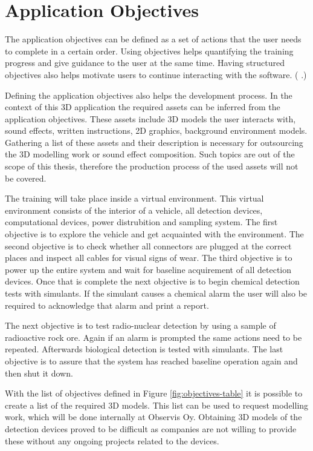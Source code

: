 \documentclass[12pt, a4paper,oneside, nocenter]{thesis}
\renewcommand{\citep}[1]{(\citeauthor{#1} \citeyear{#1}.)}
\begin{document}
\section{Application Objectives}
The application objectives can be defined as a set of actions that the user needs to complete in a certain order. Using objectives helps quantifying the training progress and give guidance to the user at the same time. Having structured objectives also helps motivate users to continue interacting with the software. \citep{goal-oriented-games}
\par
Defining the application objectives also helps the development process. In the context of this 3D application the required assets can be inferred from the application objectives. These assets include 3D models the user interacts with, sound effects, written instructions, 2D graphics, background environment models. Gathering a list of these assets and their description is necessary for outsourcing the 3D modelling work or sound effect composition. Such topics are out of the scope of this thesis, therefore the production process of the used assets will not be covered.
\par
The training will take place inside a virtual environment. This virtual environment consists of the interior of a vehicle, all detection devices, computational devices, power distrubition and sampling system. The first objective is to explore the vehicle and get acquainted with the environment. The second objective is to check whether all connectors are plugged at the correct places and inspect all cables for visual signs of wear. The third objective is to power up the entire system and wait for baseline acquirement of all detection devices. Once that is complete the next objective is to begin chemical detection tests with simulants. If the simulant causes a chemical alarm the user will also be required to acknowledge that alarm and print a report.
\par
The next objective is to test radio-nuclear detection by using a sample of radioactive rock ore. Again if an alarm is prompted the same actions need to be repeated. Afterwards biological detection is tested with simulants. The last objective is to assure that the system has reached baseline operation again and then shut it down.
\par
With the list of objectives defined in Figure \ref{fig:objectives-table} it is possible to create a list of the required 3D models. This list can be used to request modelling work, which will be done internally at Observis Oy. Obtaining 3D models of the detection devices proved to be difficult as companies are not willing to provide these without any ongoing projects related to the devices.
\end{document}
